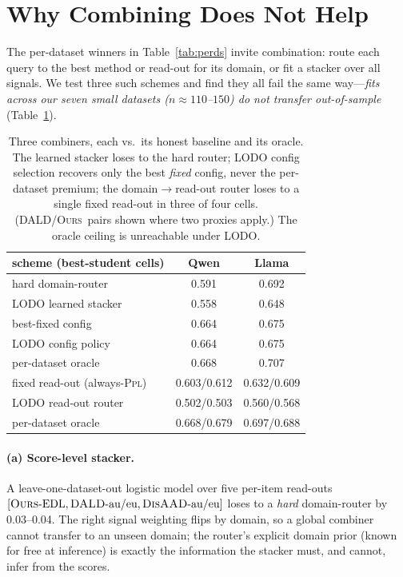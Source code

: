 \documentclass[11pt]{article}
\newcommand{\ours}{\textsc{Ours}}
\newcommand{\dald}{\textsc{DALD}}
\newcommand{\disaad}{\textsc{DisAAD}}
\newcommand{\ppl}{\textsc{Ppl}}
\begin{document}
\section{Why Combining Does Not Help}\label{sec:combiners}
The per-dataset winners in Table~\ref{tab:perds} invite combination: route each query to
the best method or read-out for its domain, or fit a stacker over all signals. We test
three such schemes and find they all fail the same way---\emph{fits across our seven
small datasets ($n{\approx}110$--$150$) do not transfer out-of-sample}
(Table~\ref{tab:lodo}).

\begin{table}[t]\centering\small
\setlength{\tabcolsep}{4pt}
\begin{tabular}{l cc}
\toprule
scheme (best-student cells) & Qwen & Llama\\
\midrule
hard domain-router          & 0.591 & 0.692\\
\quad LODO learned stacker  & 0.558 & 0.648\\
\addlinespace
best-fixed config           & 0.664 & 0.675\\
\quad LODO config policy     & 0.664 & 0.675\\
\quad per-dataset oracle     & 0.668 & 0.707\\
\addlinespace
fixed read-out (always-\ppl)& 0.603/0.612 & 0.632/0.609\\
\quad LODO read-out router  & 0.502/0.503 & 0.560/0.568\\
\quad per-dataset oracle     & 0.668/0.679 & 0.697/0.688\\
\bottomrule
\end{tabular}
\caption{Three combiners, each vs.\ its honest baseline and its oracle. The learned
stacker loses to the hard router; LODO config selection recovers only the best
\emph{fixed} config, never the per-dataset premium; the domain$\to$read-out router loses
to a single fixed read-out in three of four cells. (\dald/\ours\ pairs shown where two
proxies apply.) The oracle ceiling is unreachable under LODO.}
\label{tab:lodo}
\end{table}

\paragraph{(a) Score-level stacker.} A leave-one-dataset-out logistic model over five
per-item read-outs $[\text{\ours-EDL},\text{\dald-au/eu},\text{\disaad-au/eu}]$ loses to
a \emph{hard} domain-router by 0.03--0.04. The right signal weighting flips by domain, so
a global combiner cannot transfer to an unseen domain; the router's explicit domain
prior (known for free at inference) is exactly the information the stacker must, and
cannot, infer from the scores.
\end{document}
